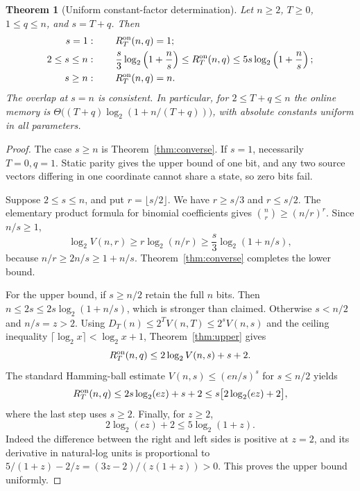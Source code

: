 \documentclass[11pt,a4paper]{article}
\newtheorem{theorem}{Theorem}[section]
\begin{document}
\begin{theorem}[Uniform constant-factor determination]\label{thm:main}
Let $n\ge2$, $T\ge0$, $1\le q\le n$, and $s=T+q$. Then
\begin{equation}\label{eq:main}
\begin{aligned}
 s=1 &: \qquad R_T^{\rm on}(n,q)=1;\\
 2\le s\le n &: \qquad \frac{s}{3}\log_2\left(1+\frac ns\right)
 \le R_T^{\rm on}(n,q)
 \le5s\log_2\left(1+\frac ns\right);\\
 s\ge n &: \qquad R_T^{\rm on}(n,q)=n.
\end{aligned}
\end{equation}
The overlap at $s=n$ is consistent. In particular, for $2\le T+q\le n$ the online memory is $\Theta\big((T+q)\log_2(1+n/(T+q))\big)$, with \emph{absolute constants} uniform in all parameters.
\end{theorem}
\begin{proof}
The case $s\ge n$ is Theorem~\ref{thm:converse}. If $s=1$, necessarily $T=0,q=1$. Static parity gives the upper bound of one bit, and any two source vectors differing in one coordinate cannot share a state, so zero bits fail.

Suppose $2\le s\le n$, and put $r=\lfloor s/2\rfloor$. We have $r\ge s/3$ and $r\le s/2$. The elementary product formula for binomial coefficients gives $\binom nr\ge(n/r)^r$. Since $n/s\ge1$,
\[
 \log_2V(n,r)\ge r\log_2(n/r)
 \ge\frac{s}{3}\log_2(1+n/s),
\]
because $n/r\ge2n/s\ge1+n/s$. Theorem~\ref{thm:converse} completes the lower bound.

For the upper bound, if $s\ge n/2$ retain the full $n$ bits. Then $n\le2s\le2s\log_2(1+n/s)$, which is stronger than claimed. Otherwise $s<n/2$ and $n/s=z>2$. Using $D_T(n)\le 2^T V(n,T)\le 2^s V(n,s)$ and the ceiling inequality $\lceil\log_2x\rceil<\log_2x+1$, Theorem~\ref{thm:upper} gives
\[
 R_T^{\rm on}(n,q)\le 2\log_2V(n,s)+s+2.
\]
The standard Hamming-ball estimate $V(n,s)\le(en/s)^s$ for $s\le n/2$ yields
\[
 R_T^{\rm on}(n,q)\le2s\log_2(ez)+s+2
 \le s\big[2\log_2(ez)+2\big],
\]
where the last step uses $s\ge2$. Finally, for $z\ge2$,
\begin{equation}\label{eq:calc}
2\log_2(ez)+2\le5\log_2(1+z).
\end{equation}
Indeed the difference between the right and left sides is positive at $z=2$, and its derivative in natural-log units is proportional to $5/(1+z)-2/z=(3z-2)/(z(1+z))>0$. This proves the upper bound uniformly.
\end{proof}
\end{document}
